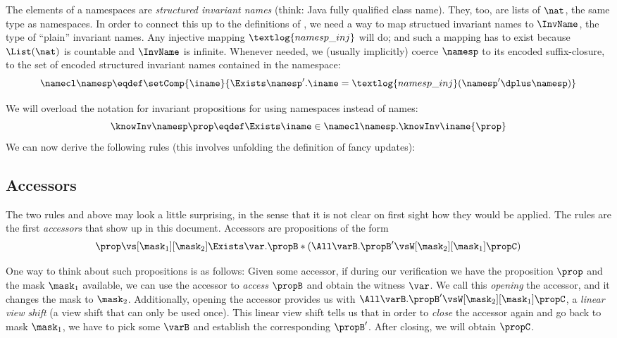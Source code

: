 The elements of a namespaces are \emph{structured invariant names} (think: Java fully qualified class name).
They, too, are lists of $\nat$, the same type as namespaces.
In order to connect this up to the definitions of , we need a way to map structued invariant names to $\InvName$, the type of ``plain'' invariant names.
Any injective mapping $\textlog{namesp\_inj}$ will do; and such a mapping has to exist because $\List(\nat)$ is countable and $\InvName$ is infinite.
Whenever needed, we (usually implicitly) coerce $\namesp$ to its encoded suffix-closure, \ie to the set of encoded structured invariant names contained in the namespace: \[\namecl\namesp \eqdef \setComp{\iname}{\Exists \namesp'. \iname = \textlog{namesp\_inj}(\namesp' \dplus \namesp)}\]

We will overload the notation for invariant propositions for using namespaces instead of names:
\[ \knowInv\namesp\prop \eqdef \Exists \iname \in \namecl\namesp. \knowInv\iname{\prop} \]
We can now derive the following rules (this involves unfolding the definition of fancy updates):

\subsection{Accessors}

The two rules  and  above may look a little surprising, in the sense that it is not clear on first sight how they would be applied.
The rules are the first \emph{accessors} that show up in this document.
Accessors are propositions of the form
\[ \prop \vs[\mask_1][\mask_2] \Exists\var. \propB * (\All\varB. \propB' \vsW[\mask_2][\mask_1] \propC) \]

One way to think about such propositions is as follows:
Given some accessor, if during our verification we have the proposition $\prop$ and the mask $\mask_1$ available, we can use the accessor to \emph{access} $\propB$ and obtain the witness $\var$.
We call this \emph{opening} the accessor, and it changes the mask to $\mask_2$.
Additionally, opening the accessor provides us with $\All\varB. \propB' \vsW[\mask_2][\mask_1] \propC$, a \emph{linear view shift} (\ie a view shift that can only be used once).
This linear view shift tells us that in order to \emph{close} the accessor again and go back to mask $\mask_1$, we have to pick some $\varB$ and establish the corresponding $\propB'$.
After closing, we will obtain $\propC$.

